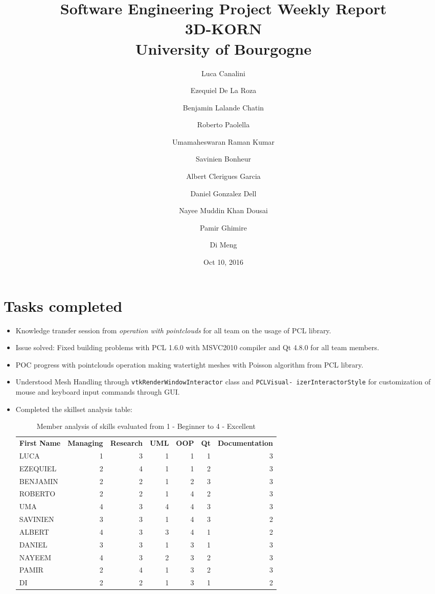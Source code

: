 \documentclass[11pt]{article} %
\title{Software Engineering Project Weekly Report\\ \textbf{3D-KORN} \\ University of Bourgogne}
\author{Luca Canalini \and Ezequiel De La Roza \and Benjamin Lalande Chatin \and Roberto Paolella \and Umamaheswaran Raman Kumar \and Savinien Bonheur \and Albert Clerigues Garcia \and Daniel Gonzalez Dell \and Nayee Muddin Khan Dousai \and Pamir Ghimire \and Di Meng
}
\date{Oct 10, 2016} %
\begin{document}
\maketitle
\newpage

\section{Tasks completed}
\begin{itemize}
	\item Knowledge transfer session from \emph{operation with pointclouds} for all team on the usage of PCL library.
	
	\item Issue solved: Fixed building problems	with PCL 1.6.0 with MSVC2010 compiler and Qt 4.8.0 for all team members.
	
	\item POC progress with pointclouds operation making watertight meshes with Poisson algorithm from PCL library.
	
	\item Understood Mesh Handling through \texttt{vtkRenderWindowInteractor} class and \texttt{PCLVisual- izerInteractorStyle} for customization of mouse and keyboard input commands through GUI.
	
	\item Completed the skillset analysis table:
\begin{table}[h]
	\centering
	\label{my-label}
	\begin{tabular}{lrrrrrr}
		\textbf{First Name}   & \textbf{Managing} & \textbf{Research} & \textbf{UML} & \textbf{OOP} & \textbf{Qt} & \textbf{Documentation} \\
		LUCA       & 1                  & 3        & 1   & 1   & 1         & 3             \\
		EZEQUIEL   & 2                  & 4        & 1   & 1   & 2         & 3             \\
		BENJAMIN   & 2                  & 2        & 1   & 2   & 3         & 3             \\
		ROBERTO    & 2                  & 2        & 1   & 4   & 2         & 3             \\
		UMA        & 4                  & 3        & 4   & 4   & 3         & 3             \\
		SAVINIEN   & 3                  & 3        & 1   & 4   & 3         & 2             \\
		ALBERT     & 4                  & 3        & 3   & 4   & 1         & 2             \\
		DANIEL     & 3                  & 3        & 1   & 3   & 1         & 3             \\
		NAYEEM     & 4                  & 3        & 2   & 3   & 2         & 3             \\
		PAMIR      & 2                  & 4        & 1   & 3   & 2         & 3             \\
		DI         & 2                  & 2        & 1   & 3   & 1         & 2                    
	\end{tabular}
\caption{Member analysis of skills evaluated from 1 - Beginner to 4 - Excellent}
\end{table}
	

\end{itemize}
\end{document}
